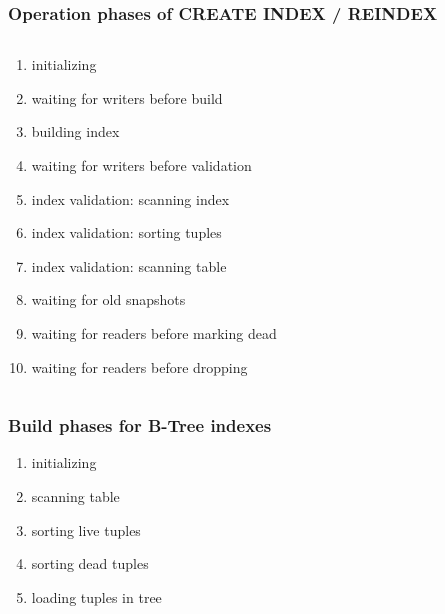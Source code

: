\documentclass[ignorenonframetext,t]{beamer}
\begin{document}
\begin{frame}
  \frametitle{Operation phases of CREATE INDEX / REINDEX}

  \begin{block}{}
    \begin{columns}[T]
      \begin{column}{0.6\textwidth}
	\begin{enumerate}
	  \item initializing
	  \item waiting for writers before build
	  \item building index
	  \item waiting for writers before validation
	  \item index validation: scanning index
	  \item index validation: sorting tuples
	  \item index validation: scanning table
	  \item waiting for old snapshots
	  \item waiting for readers before marking dead
	  \item waiting for readers before dropping
	\end{enumerate}
      \end{column}

    \end{columns}
  \end{block}
\end{frame}

\begin{frame}
  \frametitle{Build phases for B-Tree indexes}
  \begin{enumerate}
    \item initializing
    \item scanning table
    \item sorting live tuples
    \item sorting dead tuples
    \item loading tuples in tree
  \end{enumerate}
\end{frame}
\end{document}
